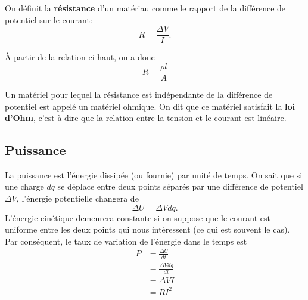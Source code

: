 On définit la \textbf{résistance} d'un matériau comme le rapport de la
différence de potentiel sur le courant:
\[
  R = \frac{\Delta V}{I}.
\]

À partir de la relation ci-haut, on a donc
\[
  R = \frac{\rho l}{A}
\]

Un matériel pour lequel la résistance est indépendante de la différence de
potentiel est appelé un matériel ohmique. On dit que ce matériel satisfait la
\textbf{loi d'Ohm}, c'est-à-dire que la relation entre la tension et le courant
est linéaire.



\subsection*{Puissance}

La puissance est l'énergie dissipée (ou fournie) par unité de temps. On sait
que si une charge $dq$ se déplace entre deux points séparés par une différence de
potentiel $\Delta V$, l'énergie potentielle changera de
$$\Delta U = \Delta V dq.$$
L'énergie cinétique demeurera constante si on suppose que le courant est
uniforme entre les deux points qui nous intéressent (ce qui est souvent le
cas). Par conséquent, le taux de variation de l'énergie dans le temps est
\begin{align*}
  P &= \frac{\Delta U}{dt} \\
    &= \frac{\Delta V dq}{dt} \\
    &= \Delta V I \\
    &= RI^2
\end{align*}

